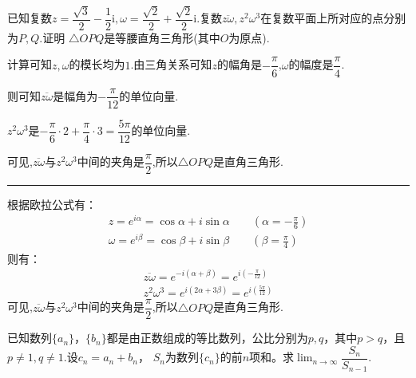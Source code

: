 \begin{questions}
	\question 已知复数$z=\dfrac{\sqrt{3}}{2} - \dfrac12\text{i}, \omega = \dfrac{\sqrt{2}}{2} +
		\dfrac{\sqrt{2}}{2}\text{i}$.复数$\overline{z\omega},z^2\omega^3$在复数平面上所对应的点分别为$P,Q$.证明
	$\triangle{OPQ}$是等腰直角三角形(其中$O$为原点).

	\begin{solution}
		计算可知$z,\omega$的模长均为$1$.由三角关系可知$z$的幅角是$-\dfrac{\pi}{6}$,$\omega$的幅度是$\dfrac{\pi}{4}$.

		则可知$\overline{z\omega}$是幅角为$-\dfrac{\pi}{12}$的单位向量.

		$z^2\omega^3$是$-\dfrac{\pi}{6}\cdot2 + \dfrac{\pi}{4}\cdot3=\dfrac{5\pi}{12}$的单位向量.

		可见,$\overline{z\omega}$与$z^2\omega^3$中间的夹角是$\dfrac{\pi}{2}$,所以$\triangle{OPQ}$是直角三角形.

		\hrule
		{
			\color{blue!50!green}
			根据欧拉公式有：
			\begin{align*}
				z = e^{i\alpha} = \cos{\alpha} + i\sin{\alpha} \qquad (\alpha = -\frac{\pi}{6}) \\
				\omega = e^{i\beta} = \cos{\beta} + i\sin{\beta} \qquad (\beta = \frac{\pi}{4})
			\end{align*}
			则有：
			\begin{align*}
				\overline{z\omega} = e^{-i(\alpha + \beta)} = e^{i(-\frac{\pi}{12})} \\
				z^2\omega^3 = e^{i(2\alpha + 3\beta)} = e^{i(\frac{5\pi}{12})}
			\end{align*}
			可见,$\overline{z\omega}$与$z^2\omega^3$中间的夹角是$\dfrac{\pi}{2}$,所以$\triangle{OPQ}$是直角三角形.

		}
	\end{solution}

	\question 已知数列$\{a_n\}， \{b_n\}$都是由正数组成的等比数列，公比分别为$p,q$，其中$p>q$，且$p\neq1, q\neq1$.设$c_n
		= a_n+b_n$， $S_n$为数列$\{c_n\}$的前$n$项和。求$\displaystyle\lim_{n\to\infty}\dfrac{S_n}{S_{n-1}}$.


\end{questions}
